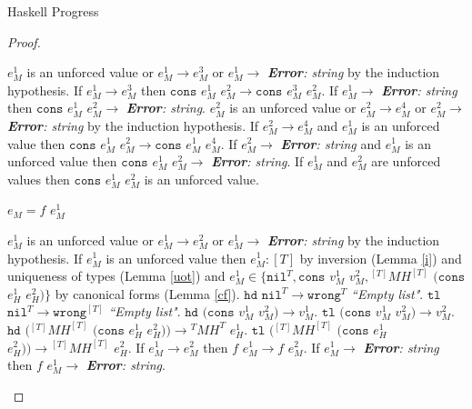 \begin{theorem}{Haskell Progress}
\begin{proof}
\begin{case}
$e_{M}^{1}$ is an unforced value or $e_{M}^{1}\rightarrow e_{M}^{3}$ or $e_{M}^{1}\rightarrow$ \emph{\textbf{Error}: string} by the induction hypothesis.  If $e_{M}^{1}\rightarrow e_{M}^{3}$ then $\mathtt{cons}$ $e_{M}^{1}$ $e_{M}^{2}\rightarrow\mathtt{cons}$ $e_{M}^{3}$ $e_{M}^{2}$.  If $e_{M}^{1}\rightarrow$ \emph{\textbf{Error}: string} then $\mathtt{cons}$ $e_{M}^{1}$ $e_{M}^{2}\rightarrow$ \emph{\textbf{Error}: string}.  $e_{M}^{2}$ is an unforced value or $e_{M}^{2}\rightarrow e_{M}^{4}$ or $e_{M}^{2}\rightarrow$ \emph{\textbf{Error}: string} by the induction hypothesis.  If $e_{M}^{2}\rightarrow e_{M}^{4}$ and $e_{M}^{1}$ is an unforced value then $\mathtt{cons}$ $e_{M}^{1}$ $e_{M}^{2}\rightarrow\mathtt{cons}$ $e_{M}^{1}$ $e_{M}^{4}$.  If $e_{M}^{2}\rightarrow$ \emph{\textbf{Error}: string} and $e_{M}^{1}$ is an unforced value then $\mathtt{cons}$ $e_{M}^{1}$ $e_{M}^{2}\rightarrow$ \emph{\textbf{Error}: string}.  If $e_{M}^{1}$ and $e_{M}^{2}$ are unforced values then $\mathtt{cons}$ $e_{M}^{1}$ $e_{M}^{2}$ is an unforced value.

\end{case}


\begin{case}

$e_{M}=f$ $e_{M}^{1}$

$e_{M}^{1}$ is an unforced value or $e_{M}^{1}\rightarrow e_{M}^{2}$ or $e_{M}^{1}\rightarrow$ \emph{\textbf{Error}: string} by the induction hypothesis.  If $e_{M}^{1}$ is an unforced value then $e_{M}^{1}:[T]$ by inversion (Lemma \ref{i}) and uniqueness of types (Lemma \ref{uot}) and $e_{M}^{1}\in\lbrace\mathtt{nil}^{T},\mathtt{cons}$ $v_{M}^{1}$ $v_{M}^{2},{^{[T]}M}H^{[T]}$ $(\mathtt{cons}$ $e_{H}^{1}$ $e_{H}^{2})\rbrace$ by canonical forms (Lemma \ref{cf}).  $\mathtt{hd}$ $\mathtt{nil}^{T}\rightarrow\mathtt{wrong}^{T}$ \emph{``Empty list"}.  $\mathtt{tl}$ $\mathtt{nil}^{T}\rightarrow\mathtt{wrong}^{[T]}$ \emph{``Empty list"}.  $\mathtt{hd}$ $(\mathtt{cons}$ $v_{M}^{1}$ $v_{M}^{2})\rightarrow v_{M}^{1}$.  $\mathtt{tl}$ $(\mathtt{cons}$ $v_{M}^{1}$ $v_{M}^{2})\rightarrow v_{M}^{2}$.  $\mathtt{hd}$ $({^{[T]}M}H^{[T]}$ $(\mathtt{cons}$ $e_{H}^{1}$ $e_{H}^{2}))\rightarrow{^{T}M}H^{T}$ $e_{H}^{1}$.  $\mathtt{tl}$ $({^{[T]}M}H^{[T]}$ $(\mathtt{cons}$ $e_{H}^{1}$ $e_{H}^{2}))\rightarrow{^{[T]}M}H^{[T]}$ $e_{H}^{2}$.  If $e_{M}^{1}\rightarrow e_{M}^{2}$ then $f$ $e_{M}^{1}\rightarrow f$ $e_{M}^{2}$.  If $e_{M}^{1}\rightarrow$ \emph{\textbf{Error}: string} then $f$ $e_{M}^{1}\rightarrow$ \emph{\textbf{Error}: string}.


\end{case}
\end{proof}
\end{theorem}
